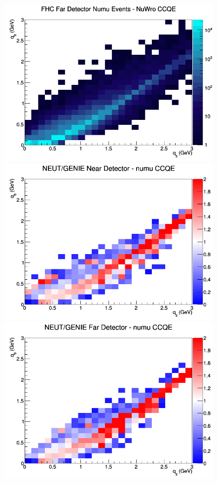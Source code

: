 \documentclass[12pt]{article}
\begin{document}
\begin{figure}[h]
\endminipage
{}
\includegraphics[width=\linewidth]{eff_q0_q3/LAr/CCQE_FHC_FD_numu_q3_q0_NuWro.png}
\endminipage
\newline
{}
\includegraphics[width=\linewidth]{eff_q0_q3/LAr/ratios/CCQE_NEUT_GENIE_numu_near_q3_q0.png}
\endminipage
{}
\includegraphics[width=\linewidth]{eff_q0_q3/LAr/ratios/CCQE_NEUT_GENIE_numu_far_q3_q0.png}

\end{figure}
\end{document}
